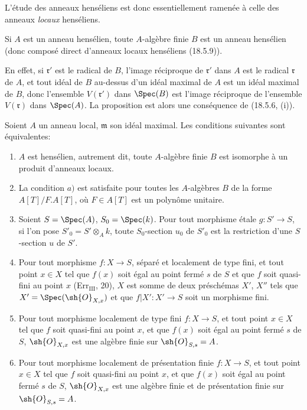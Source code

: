 L'étude des anneaux henséliens est donc essentiellement ramenée à celle des anneaux \emph{locaux} henséliens.

\begin{proposition}[18.5.10]
\label{IV.18.5.10}
Si $A$ est un anneau hensélien, toute $A$-algèbre finie $B$ est un anneau hensélien (donc composé direct d'anneaux locaux henséliens (18.5.9)).
\end{proposition}

En effet, si $\mathfrak r'$ est le radical de $B$, l'image réciproque de $\mathfrak r'$ dans $A$ est le radical $\mathfrak r$ de $A$, et tout idéal de $B$ au-dessus d'un idéal maximal de $A$ est un idéal maximal de $B$, donc l'ensemble $V(\mathfrak r')$ dans $\Spec(B)$ est l'image réciproque de l'ensemble $V(\mathfrak r)$ dans $\Spec(A)$. La proposition est alors une conséquence de (18.5.6, (i)).

\begin{theorem}[18.5.11]
\label{IV.18.5.11}
Soient $A$ un anneau local, $\mathfrak m$ son idéal maximal. Les conditions suivantes sont équivalentes:
\begin{enumerate}
  \item[a)] $A$ est hensélien, autrement dit, toute $A$-algèbre finie $B$ est isomorphe à un produit d'anneaux locaux.


  \item[a')] La condition $a)$ est satisfaite pour toutes les $A$-algèbres $B$ de la forme $A[T]/F.A[T]$, où $F\in A[T]$ est un polynôme unitaire.
  \item[b)] Soient $S=\Spec(A)$, $S_0=\Spec(k)$. Pour tout morphisme étale $g:S'\to S$, si l'on pose $S'_0=S'\otimes_A k$, toute $S_0$-section $u_0$ de $S'_0$ est la restriction d'une $S$-section $u$ de $S'$.
  \item[c)] Pour tout morphisme $f:X\to S$, séparé et localement de type fini, et tout point $x\in X$ tel que $f(x)$ soit égal au point fermé $s$ de $S$ et que $f$ soit quasi-fini au point $x$ (Err$_{\mathrm{III}}$, 20), $X$ est somme de deux préschémas $X'$, $X''$ tels que $X'=\Spec(\sh{O}_{X,x})$ et que $f|X':X'\to S$ soit un morphisme fini.
  \item[c')] Pour tout morphisme localement de type fini $f:X\to S$, et tout point $x\in X$ tel que $f$ soit quasi-fini au point $x$, et que $f(x)$ soit égal au point fermé $s$ de $S$, $\sh{O}_{X,x}$ est une algèbre finie sur $\sh{O}_{S,s}=A$.
  \item[c'')] Pour tout morphisme localement de présentation finie $f:X\to S$, et tout point $x\in X$ tel que $f$ soit quasi-fini au point $x$, et que $f(x)$ soit égal au point fermé $s$ de $S$, $\sh{O}_{X,x}$ est une algèbre finie et de présentation finie sur $\sh{O}_{S,s}=A$.
\end{enumerate}
\end{theorem}

